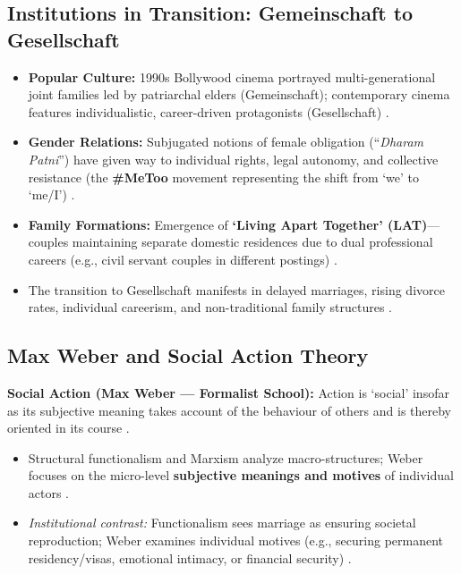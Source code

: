 \subsection{Institutions in Transition: Gemeinschaft to Gesellschaft}

\begin{ComparisonBox}
\begin{itemize}
    \item \textbf{Popular Culture:} 1990s Bollywood cinema portrayed multi-generational joint families led by patriarchal elders (Gemeinschaft); contemporary cinema features individualistic, career-driven protagonists (Gesellschaft) .
    \item \textbf{Gender Relations:} Subjugated notions of female obligation (``\textit{Dharam Patni}'') have given way to individual rights, legal autonomy, and collective resistance (the \textbf{\#MeToo} movement representing the shift from `we' to `me/I') .
    \item \textbf{Family Formations:} Emergence of \textbf{`Living Apart Together' (LAT)}---couples maintaining separate domestic residences due to dual professional careers (e.g., civil servant couples in different postings) .
\end{itemize}
\end{ComparisonBox}

\begin{QuickRevision}
\begin{itemize}
    \item The transition to Gesellschaft manifests in delayed marriages, rising divorce rates, individual careerism, and non-traditional family structures .
\end{itemize}
\end{QuickRevision}

\subsection{Max Weber and Social Action Theory}

\begin{KeyConcept}
\textbf{Social Action (Max Weber --- Formalist School):} Action is `social' insofar as its subjective meaning takes account of the behaviour of others and is thereby oriented in its course .
\begin{itemize}
    \item Structural functionalism and Marxism analyze macro-structures; Weber focuses on the micro-level \textbf{subjective meanings and motives} of individual actors .
    \item \textit{Institutional contrast:} Functionalism sees marriage as ensuring societal reproduction; Weber examines individual motives (e.g., securing permanent residency/visas, emotional intimacy, or financial security) .
\end{itemize}
\end{KeyConcept}

